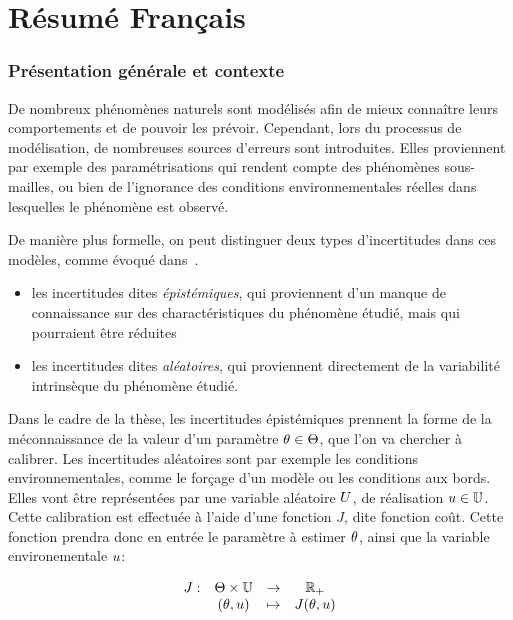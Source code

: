 \documentclass[../../Main_ManuscritThese.tex]{subfiles}
\begin{document}
\chapter*{Résumé Français}
\TitleBtwLines

{}
\label{chap:resume_fr}
\pagestyle{resumeStyle}

\subsection*{Présentation générale et contexte}
De nombreux phénomènes naturels sont modélisés afin de mieux connaître
leurs comportements et de pouvoir les prévoir.  Cependant, lors du
processus de modélisation, de nombreuses sources d'erreurs sont
introduites. Elles proviennent par exemple des paramétrisations qui
rendent compte des phénomènes sous-mailles, ou bien de l'ignorance des
conditions environnementales réelles dans lesquelles le phénomène est
observé.

De manière plus formelle, on peut distinguer deux types d'incertitudes
dans ces modèles, comme évoqué dans~\cite{walker_defining_2003}.
\begin{itemize}
\item les incertitudes dites \emph{épistémiques}, qui proviennent d'un
  manque de connaissance sur des charactéristiques du phénomène
  étudié, mais qui pourraient être réduites
\item les incertitudes dites \emph{aléatoires}, qui proviennent
  directement de la variabilité intrinsèque du phénomène étudié.
\end{itemize}

Dans le cadre de la thèse, les incertitudes épistémiques prennent la
forme de la méconnaissance de la valeur d'un paramètre
$\theta \in \Theta$, que l'on va chercher à calibrer. Les incertitudes
aléatoires sont par exemple les conditions environnementales, comme le
forçage d'un modèle ou les conditions aux bords. Elles vont être
représentées par une variable aléatoire $U$, de réalisation
$u\in \mathbb{U}$.  Cette calibration est effectuée à l'aide d'une
fonction $J$, dite fonction coût. Cette fonction prendra donc en
entrée le paramètre à estimer $\theta$, ainsi que la variable
environementale $u$:

\begin{equation}
  \label{eq:def_J}
  \begin{array}{rccc}
   J: & \Theta\times\mathbb{U}& \rightarrow& \mathbb{R}_+ \\
   &(\theta,u)& \mapsto& J(\theta,u)
  \end{array}
\end{equation}
\end{document}
